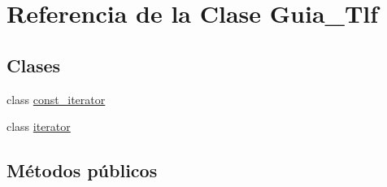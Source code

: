 \hypertarget{classGuia__Tlf}{}\section{Referencia de la Clase Guia\+\_\+\+Tlf}
\label{classGuia__Tlf}
\subsection*{Clases}
\begin{DoxyCompactItemize}
\item 
class \hyperlink{classGuia__Tlf_1_1const__iterator}{const\+\_\+iterator}
\item 
class \hyperlink{classGuia__Tlf_1_1iterator}{iterator}
\end{DoxyCompactItemize}
\subsection*{Métodos públicos}
